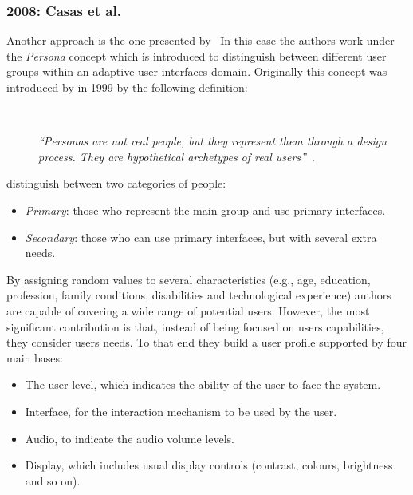
\subsubsection{2008: Casas et al.}
\label{sec:casas}

Another approach is the one presented by~\citet{casas_user_2008} In this case 
the authors work under the \textit{Persona} concept which is introduced to 
distinguish between different user groups within an adaptive user interfaces
domain. Originally this concept was introduced by \citeauthor{cooper_inmates_2004} 
in 1999 by the following definition:

\begin{description}
  \item[] \hfill \\
  \begin{mdframed}[hidealllines=true,backgroundcolor=gray!20]
  \textit{``Personas are not real people, but they represent them through a design 
  process. They are hypothetical archetypes of real users''}~\cite{cooper_inmates_2004}. 
  \end{mdframed}
\end{description}

\citeauthor{casas_user_2008} distinguish between two categories of people:

\begin{itemize}
 \item \textit{Primary}: those who represent the main group and use primary 
 interfaces. 
 \item \textit{Secondary}: those who can use primary interfaces, but with 
 several extra needs.
\end{itemize}

By assigning random values to several characteristics (e.g., age, education,
profession, family conditions, disabilities and technological experience) 
authors are capable of covering a wide range of potential users. However, the 
most significant contribution is that, instead of being focused on users 
capabilities, they consider users needs. To that end they build a user 
profile supported by four main bases: 

\begin{itemize}
 \item The user level, which indicates the ability of the user to face the 
 system.
 \item Interface, for the interaction mechanism to be used by the user.
 \item Audio, to indicate the audio volume levels.
 \item Display, which includes usual display controls (contrast, colours, 
 brightness and so on).
\end{itemize}

